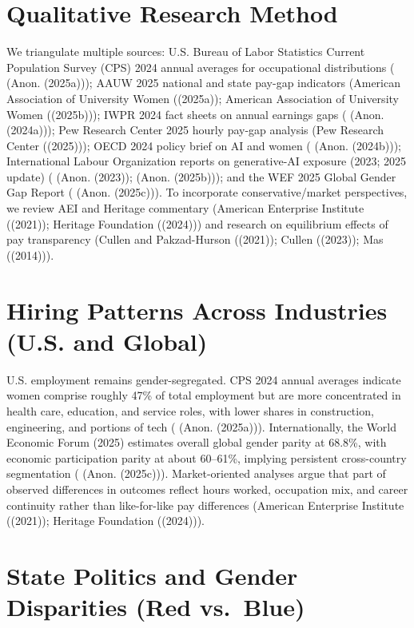 \documentclass[
  letterpaper,
  DIV=11,
  numbers=noendperiod]{scrartcl}
\begin{document}
\section{Qualitative Research Method}\label{qualitative-research-method}

We triangulate multiple sources: U.S. Bureau of Labor Statistics Current
Population Survey (CPS) 2024 annual averages for occupational
distributions ( (Anon. (2025a))); AAUW 2025 national and state pay-gap
indicators (American Association of University Women ((2025a)); American
Association of University Women ((2025b))); IWPR 2024 fact sheets on
annual earnings gaps ( (Anon. (2024a))); Pew Research Center 2025 hourly
pay-gap analysis (Pew Research Center ((2025))); OECD 2024 policy brief
on AI and women ( (Anon. (2024b))); International Labour Organization
reports on generative-AI exposure (2023; 2025 update) ( (Anon. (2023));
(Anon. (2025b))); and the WEF 2025 Global Gender Gap Report ( (Anon.
(2025c))). To incorporate conservative/market perspectives, we review
AEI and Heritage commentary (American Enterprise Institute ((2021));
Heritage Foundation ((2024))) and research on equilibrium effects of pay
transparency (Cullen and Pakzad-Hurson ((2021)); Cullen ((2023)); Mas
((2014))).

\section{Hiring Patterns Across Industries (U.S. and
Global)}\label{hiring-patterns-across-industries-u.s.-and-global}

U.S. employment remains gender-segregated. CPS 2024 annual averages
indicate women comprise roughly 47\% of total employment but are more
concentrated in health care, education, and service roles, with lower
shares in construction, engineering, and portions of tech ( (Anon.
(2025a))). Internationally, the World Economic Forum (2025) estimates
overall global gender parity at 68.8\%, with economic participation
parity at about 60--61\%, implying persistent cross-country segmentation
( (Anon. (2025c))). Market-oriented analyses argue that part of observed
differences in outcomes reflect hours worked, occupation mix, and career
continuity rather than like-for-like pay differences (American
Enterprise Institute ((2021)); Heritage Foundation ((2024))).

\section{State Politics and Gender Disparities (Red
vs.~Blue)}\label{state-politics-and-gender-disparities-red-vs.-blue}
\end{document}
